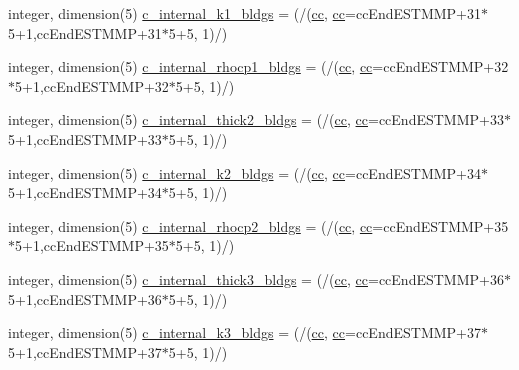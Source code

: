 \begin{DoxyCompactItemize}
\item 
integer, dimension(5) \hyperlink{namespaceallocatearray_af2158ba2afb645dfef8aeb1a93a1dec7}{c\+\_\+internal\+\_\+k1\+\_\+bldgs} = (/(\hyperlink{namespaceallocatearray_ac863c81704eb507dee10f5e10741e10c}{cc}, \hyperlink{namespaceallocatearray_ac863c81704eb507dee10f5e10741e10c}{cc}=cc\+End\+E\+S\+T\+M\+MP+31$\ast$5+1,cc\+End\+E\+S\+T\+M\+MP+31$\ast$5+5, 1)/)
\item 
integer, dimension(5) \hyperlink{namespaceallocatearray_a1592e6ac2bce2d65c9e0ebe0e5c97122}{c\+\_\+internal\+\_\+rhocp1\+\_\+bldgs} = (/(\hyperlink{namespaceallocatearray_ac863c81704eb507dee10f5e10741e10c}{cc}, \hyperlink{namespaceallocatearray_ac863c81704eb507dee10f5e10741e10c}{cc}=cc\+End\+E\+S\+T\+M\+MP+32$\ast$5+1,cc\+End\+E\+S\+T\+M\+MP+32$\ast$5+5, 1)/)
\item 
integer, dimension(5) \hyperlink{namespaceallocatearray_af11e6ee064aaacc4d28820ad00309f0d}{c\+\_\+internal\+\_\+thick2\+\_\+bldgs} = (/(\hyperlink{namespaceallocatearray_ac863c81704eb507dee10f5e10741e10c}{cc}, \hyperlink{namespaceallocatearray_ac863c81704eb507dee10f5e10741e10c}{cc}=cc\+End\+E\+S\+T\+M\+MP+33$\ast$5+1,cc\+End\+E\+S\+T\+M\+MP+33$\ast$5+5, 1)/)
\item 
integer, dimension(5) \hyperlink{namespaceallocatearray_ab244f908ab9c1ad7b312e932bb423acc}{c\+\_\+internal\+\_\+k2\+\_\+bldgs} = (/(\hyperlink{namespaceallocatearray_ac863c81704eb507dee10f5e10741e10c}{cc}, \hyperlink{namespaceallocatearray_ac863c81704eb507dee10f5e10741e10c}{cc}=cc\+End\+E\+S\+T\+M\+MP+34$\ast$5+1,cc\+End\+E\+S\+T\+M\+MP+34$\ast$5+5, 1)/)
\item 
integer, dimension(5) \hyperlink{namespaceallocatearray_a4ec1b8fb02c4b559c4fb8d8b82b800fb}{c\+\_\+internal\+\_\+rhocp2\+\_\+bldgs} = (/(\hyperlink{namespaceallocatearray_ac863c81704eb507dee10f5e10741e10c}{cc}, \hyperlink{namespaceallocatearray_ac863c81704eb507dee10f5e10741e10c}{cc}=cc\+End\+E\+S\+T\+M\+MP+35$\ast$5+1,cc\+End\+E\+S\+T\+M\+MP+35$\ast$5+5, 1)/)
\item 
integer, dimension(5) \hyperlink{namespaceallocatearray_a1d2cef0d909c186f48abcaac79286f29}{c\+\_\+internal\+\_\+thick3\+\_\+bldgs} = (/(\hyperlink{namespaceallocatearray_ac863c81704eb507dee10f5e10741e10c}{cc}, \hyperlink{namespaceallocatearray_ac863c81704eb507dee10f5e10741e10c}{cc}=cc\+End\+E\+S\+T\+M\+MP+36$\ast$5+1,cc\+End\+E\+S\+T\+M\+MP+36$\ast$5+5, 1)/)
\item 
integer, dimension(5) \hyperlink{namespaceallocatearray_a1eb952a71026325d2a811a547008ca14}{c\+\_\+internal\+\_\+k3\+\_\+bldgs} = (/(\hyperlink{namespaceallocatearray_ac863c81704eb507dee10f5e10741e10c}{cc}, \hyperlink{namespaceallocatearray_ac863c81704eb507dee10f5e10741e10c}{cc}=cc\+End\+E\+S\+T\+M\+MP+37$\ast$5+1,cc\+End\+E\+S\+T\+M\+MP+37$\ast$5+5, 1)/)

\end{DoxyCompactItemize}
